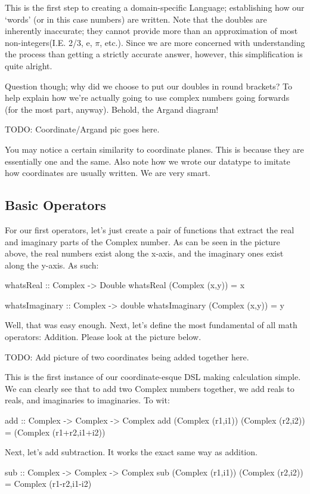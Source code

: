 This is the first step to creating a domain-specific Language; establishing how our `words' (or in this case numbers) are written. Note that the doubles are inherently inaccurate; they cannot provide more than an approximation of most non-integers(I.E. 2/3, e, $\pi$, etc.). Since we are more concerned with understanding the process than getting a strictly accurate answer, however, this simplification is quite alright.

Question though; why did we choose to put our doubles in round brackets? To help explain how we're actually going to use complex numbers going forwards (for the most part, anyway). Behold, the Argand diagram!

TODO: Coordinate/Argand pic goes here.

You may notice a certain similarity to coordinate planes. This is because they are essentially one and the same. Also note how we wrote our datatype to imitate how coordinates are usually written. We are very smart.

\subsection{Basic Operators}

For our first operators, let's just create a pair of functions that extract the real and imaginary parts of the Complex number. As can be seen in the picture above, the real numbers exist along the x-axis, and the imaginary ones exist along the y-axis. As such:
\begin{code}
whatsReal :: Complex -> Double
whatsReal (Complex (x,y)) = x

whatsImaginary :: Complex -> double
whatsImaginary (Complex (x,y)) = y
\end{code}

Well, that was easy enough. Next, let's define the most fundamental of all math operators: Addition. Please look at the picture below.

TODO: Add picture of two coordinates being added together here.

This is the first instance of our coordinate-esque DSL making calculation simple. We can clearly see that to add two Complex numbers together, we add reals to reals, and imaginaries to imaginaries. To wit:
\begin{code}
add :: Complex -> Complex -> Complex
add (Complex (r1,i1)) (Complex (r2,i2)) = (Complex (r1+r2,i1+i2))
\end{code}

Next, let's add subtraction. It works the exact same way as addition.
\begin{code}
sub :: Complex -> Complex -> Complex
sub (Complex (r1,i1)) (Complex (r2,i2)) = Complex (r1-r2,i1-i2)
\end{code}

